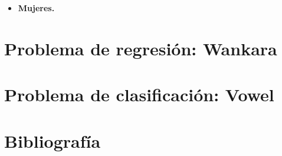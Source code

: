 \begin{itemize}
	
	
	
	
	\item \textbf{Mujeres.}
\end{itemize}


\section{Problema de regresión: Wankara}






\section{Problema de clasificación: Vowel}


\newpage
\section{Bibliografía}




